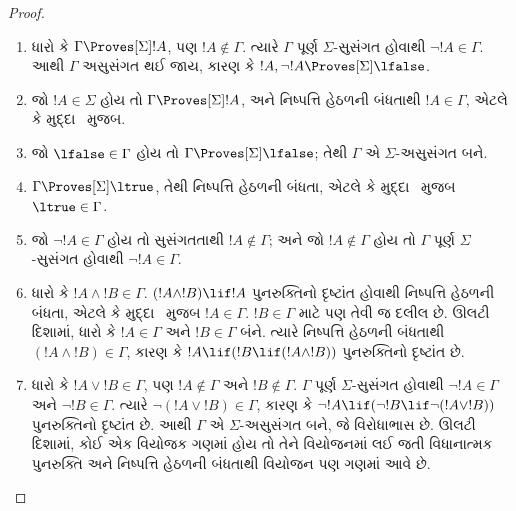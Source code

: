 \begin{proof}
  \begin{enumerate}
  \item ધારો કે $\Gamma \Proves[\Sigma] !A$, પણ $!A \notin
    \Gamma$. ત્યારે $\Gamma$ પૂર્ણ $\Sigma$-સુસંગત હોવાથી
    $\lnot!A \in \Gamma$. આથી $\Gamma$ અસુસંગત થઈ જાય, કારણ કે
    $!A, \lnot !A \Proves[\Sigma] \lfalse$.

  \item જો $!A \in \Sigma$ હોય તો $\Gamma \Proves[\Sigma] !A$,
    અને નિષ્પત્તિ હેઠળની બંધતાથી $!A \in \Gamma$, એટલે કે
    મુદ્દા~ મુજબ.

  \item જો $\lfalse \in \Gamma$ હોય તો $\Gamma
    \Proves[\Sigma] \lfalse$; તેથી $\Gamma$ એ
    $\Sigma$-અસુસંગત બને.

  \item $\Gamma \Proves[\Sigma] \ltrue$, તેથી
    નિષ્પત્તિ હેઠળની બંધતા, એટલે કે મુદ્દા~
    મુજબ $\ltrue \in \Gamma$.

  \item જો $\lnot!A \in \Gamma$ હોય તો સુસંગતતાથી $!A \notin
    \Gamma$; અને જો $!A \notin \Gamma$ હોય તો $\Gamma$ પૂર્ણ
    $\Sigma$-સુસંગત હોવાથી $\lnot !A \in \Gamma$.

  \item ધારો કે $!A \land !B \in
      \Gamma$. $(!A \land !B) \lif !A$ પુનરુક્તિનો દૃષ્ટાંત હોવાથી
      નિષ્પત્તિ હેઠળની બંધતા, એટલે કે મુદ્દા~
      મુજબ $!A \in \Gamma$. $!B \in \Gamma$ માટે પણ તેવી જ દલીલ છે.
      ઊલટી દિશામાં, ધારો કે $!A \in \Gamma$ અને $!B \in
      \Gamma$ બંને. ત્યારે નિષ્પત્તિ હેઠળની બંધતાથી $(!A \land !B) \in
      \Gamma$, કારણ કે $!A \lif (!B \lif (!A \land !B))$
      પુનરુક્તિનો દૃષ્ટાંત છે.

  \item ધારો કે $!A \lor !B \in
      \Gamma$, પણ $!A \notin \Gamma$ અને $!B \notin \Gamma$.
      $\Gamma$ પૂર્ણ $\Sigma$-સુસંગત હોવાથી $\lnot!A \in \Gamma$
      અને $\lnot !B \in \Gamma$. ત્યારે $\lnot(!A \lor !B) \in
      \Gamma$, કારણ કે $\lnot !A \lif (\lnot !B \lif \lnot (!A \lor !B))$
      પુનરુક્તિનો દૃષ્ટાંત છે. આથી $\Gamma$ એ $\Sigma$-અસુસંગત
      બને, જે વિરોધાભાસ છે. ઊલટી દિશામાં, કોઈ એક વિયોજક ગણમાં હોય તો
      તેને વિયોજનમાં લઈ જતી વિધાનાત્મક પુનરુક્તિ અને નિષ્પત્તિ હેઠળની
      બંધતાથી વિયોજન પણ ગણમાં આવે છે.


\end{enumerate}
\end{proof}
